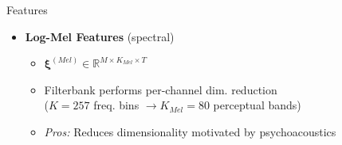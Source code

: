 \documentclass[8pt,hyperref={pdfpagelabels=true},xcolor=table,aspectratio=169]{beamer}
\begin{document}
\begin{frame}{Features}
{\begin{itemize}
        \item \textbf{Log-Mel Features} (spectral)
              \begin{itemize}
                  \item $\bm{\xi}^{(Mel)} \in \mathbb{R}^{M \times K_{Mel} \times T}$
                  \item Filterbank performs per-channel dim. reduction  \\ ($K=257$ freq. bins $\rightarrow K_{Mel}=80$ perceptual bands)
                  \item \textit{Pros:} Reduces dimensionality motivated by psychoacoustics
              \end{itemize}
    \end{itemize}
    }
\end{frame}
\end{document}
